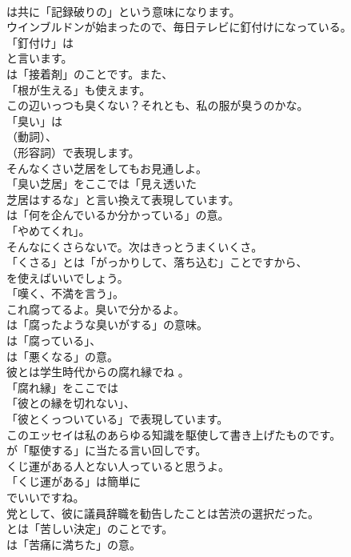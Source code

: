 \documentclass[8pt]{extreport}
\begin{document}
\begin{CJK}{UTF8}{min}
\\	は共に「記録破りの」という意味になります。	
\\	ウインブルドンが始まったので、毎日テレビに釘付けになっている。 
\\	「釘付け」は
\\	と言います。
\\	は「接着剤」のことです。また、
\\	「根が生える」も使えます。	
\\	この辺いっつも臭くない？それとも、私の服が臭うのかな。 
\\	「臭い」は
\\	（動詞）、
\\	（形容詞）で表現します。	
\\	そんなくさい芝居をしてもお見通しよ。 
\\	「臭い芝居」をここでは「見え透いた
\\	芝居はするな」と言い換えて表現しています。
\\	は「何を企んでいるか分かっている」の意。
\\	「やめてくれ」。	
\\	そんなにくさらないで。次はきっとうまくいくさ。 
\\	「くさる」とは「がっかりして、落ち込む」ことですから、
\\	を使えばいいでしょう。
\\	「嘆く、不満を言う」。	
\\	これ腐ってるよ。臭いで分かるよ。 
\\	は「腐ったような臭いがする」の意味。
\\	は「腐っている」、
\\	は「悪くなる」の意。	
\\	彼とは学生時代からの腐れ縁でね 。 
\\	「腐れ縁」をここでは
\\	「彼との縁を切れない」、
\\	「彼とくっついている」で表現しています。	
\\	このエッセイは私のあらゆる知識を駆使して書き上げたものです。 
\\	が「駆使する」に当たる言い回しです。	
\\	くじ運がある人とない人っていると思うよ。 
\\	「くじ運がある」は簡単に
\\	でいいですね。	
\\	党として、彼に議員辞職を勧告したことは苦渋の選択だった。 
\\	とは「苦しい決定」のことです。
\\	は「苦痛に満ちた」の意。	

\end{CJK}
\end{document}

